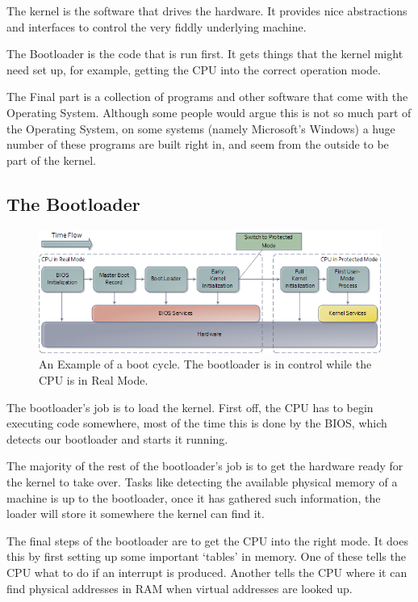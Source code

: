 \documentclass[a4paper]{report}
\begin{document}
The kernel is the software that drives the hardware. It provides nice abstractions and interfaces to control the very fiddly underlying machine.

The Bootloader is the code that is run first. It gets things that the kernel might need set up, for example, getting the CPU into the correct operation mode.

The Final part is a collection of programs and other software that come with the Operating System. Although some people would argue this is not so much part of the Operating System, on some systems (namely Microsoft's Windows) a huge number of these programs are built right in, and seem from the outside to be part of the kernel.

\subsection*{The Bootloader}

\begin{figure}[ht]
\centering
\includegraphics[width=500px]{images/bootProcess.png}
\caption{An Example of a boot cycle. The bootloader is in control while the CPU is in Real Mode.}
\label{fig:theloader}
\end{figure}

The bootloader's job is to load the kernel. First off, the CPU has to begin executing code somewhere, most of the time this is done by the BIOS, which detects our bootloader and starts it running.

The majority of the rest of the bootloader's job is to get the hardware ready for the kernel to take over. Tasks like detecting the available physical memory of a machine is up to the bootloader, once it has gathered such information, the loader will store it somewhere the kernel can find it.

The final steps of the bootloader are to get the CPU into the right mode. It does this by first setting up some important `tables' in memory. One of these tells the CPU what to do if an interrupt is produced. Another tells the CPU where it can find physical addresses in RAM when virtual addresses are looked up.
\end{document}
